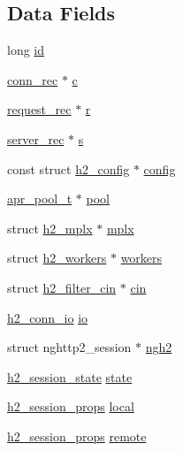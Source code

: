 \subsection*{Data Fields}
\begin{DoxyCompactItemize}
\item 
long \hyperlink{structh2__session_a00e5945662f1e1b72b9d22c384f5a46f}{id}
\item 
\hyperlink{structconn__rec}{conn\+\_\+rec} $\ast$ \hyperlink{structh2__session_abeacbf3e093a3fc5d67609497c82daba}{c}
\item 
\hyperlink{structrequest__rec}{request\+\_\+rec} $\ast$ \hyperlink{structh2__session_abd4313edcb03e33b65e6aa0cd3aa9d45}{r}
\item 
\hyperlink{structserver__rec}{server\+\_\+rec} $\ast$ \hyperlink{structh2__session_ad1d64aadf7d723fce3f895b708fb8e8e}{s}
\item 
const struct \hyperlink{structh2__config}{h2\+\_\+config} $\ast$ \hyperlink{structh2__session_a6a834c27d772bd80f1837723e3ef04b8}{config}
\item 
\hyperlink{structapr__pool__t}{apr\+\_\+pool\+\_\+t} $\ast$ \hyperlink{structh2__session_afdf0f242195dccfd3dca1bd779620cfb}{pool}
\item 
struct \hyperlink{structh2__mplx}{h2\+\_\+mplx} $\ast$ \hyperlink{structh2__session_a79ed4d816ae7efbb0f109875350c7b42}{mplx}
\item 
struct \hyperlink{structh2__workers}{h2\+\_\+workers} $\ast$ \hyperlink{structh2__session_a24c052e0673df7f54f52f66dc3418057}{workers}
\item 
struct \hyperlink{structh2__filter__cin}{h2\+\_\+filter\+\_\+cin} $\ast$ \hyperlink{structh2__session_a769e774a574d53062823fe2d798e060f}{cin}
\item 
\hyperlink{structh2__conn__io}{h2\+\_\+conn\+\_\+io} \hyperlink{structh2__session_a04388fcbed566fdfc1b39df649b9b171}{io}
\item 
struct nghttp2\+\_\+session $\ast$ \hyperlink{structh2__session_add0721875b1a24e581d276149984af8f}{ngh2}
\item 
\hyperlink{h2_8h_ae2ebe57b68f1b311a5abbdb970061f23}{h2\+\_\+session\+\_\+state} \hyperlink{structh2__session_abe17a5d4b3c3f9e796b73ec004edb72f}{state}
\item 
\hyperlink{structh2__session__props}{h2\+\_\+session\+\_\+props} \hyperlink{structh2__session_ac2afb4ae0d9cfc53e91067652dac716c}{local}
\item 
\hyperlink{structh2__session__props}{h2\+\_\+session\+\_\+props} \hyperlink{structh2__session_a80fcd5b884ec0b7fb15339beda197f99}{remote}

\end{DoxyCompactItemize}
